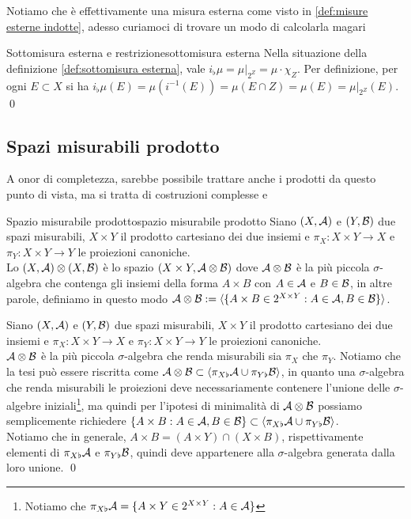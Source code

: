 \documentclass{article}
\renewcommand\A{\mc{A}}
\begin{document}
Notiamo che è effettivamente una misura esterna come visto in \ref{def:misure esterne indotte}, adesso curiamoci di trovare un modo di calcolarla magari

\begin{proposition}{Sottomisura esterna e restrizione}{sottomisura esterna}
    Nella situazione della definizione \ref{def:sottomisura esterna}, vale $i_\flat \mu = \mu|_{2^Z} = \mu \cdot \chi_Z$.
    \proof
    Per definizione, per ogni $E\subset X$ si ha $i_\flat \mu(E) = \mu(i^{-1}(E)) = \mu(E\cap Z) = \mu(E) = \mu|_{2^Z}(E)$.
    \qed
\end{proposition}

\pagebreak
\subsection{Spazi misurabili prodotto}

A onor di completezza, sarebbe possibile trattare anche i prodotti da questo punto di vista, ma si tratta di costruzioni complesse e 

\begin{definition}{Spazio misurabile prodotto}{spazio misurabile prodotto}
    Siano $(X,\A)$ e $(Y,\mathcal{B})$ due spazi misurabili, $X\times Y$ il prodotto cartesiano dei due insiemi e $\pi_X : X\times Y \to X$ e $\pi_Y : X\times Y \to Y$ le proiezioni canoniche.\\
    Lo  $(X,\A)\otimes (X,\B)$ è lo spazio $(X\times Y, \A \otimes \B)$ dove $\A \otimes\B$ è la più piccola $\sigma$-algebra che contenga gli insiemi della forma $A\times B$ con $A \in \A$ e $B \in \mathcal{B}$, in altre parole, definiamo in questo modo $\A\otimes\B := \langle\{A\times B \in 2^{X\times Y} : A \in \A, B\in \B\}\rangle$.
\end{definition}
\begin{remark}{}{}
    Siano $(X,\A)$ e $(Y,\mathcal{B})$ due spazi misurabili, $X\times Y$ il prodotto cartesiano dei due insiemi e $\pi_X : X\times Y \to X$ e $\pi_Y : X\times Y \to Y$ le proiezioni canoniche.\\
    $\A \otimes \B$ è la più piccola $\sigma$-algebra che renda misurabili sia $\pi_X$ che $\pi_Y$.
    \proof
    Notiamo che la tesi può essere riscritta come $\A\otimes\B \subset \langle\pi_{X\flat} \A \cup \pi_{Y\flat} \B\rangle $, in quanto una $\sigma$-algebra che renda misurabili le proiezioni deve necessariamente contenere l'unione delle $\sigma$-algebre iniziali\footnote{Notiamo che $\pi_{X\flat}\A = \{A \times Y \in 2^{X\times Y} : A \in \A\}$}, ma quindi per l'ipotesi di minimalità di $\A\otimes\B$ possiamo semplicemente richiedere $\{A\times B : A \in \A, B \in \B\}\subset \langle\pi_{X\flat} \A \cup \pi_{Y\flat} \B\rangle$.\\
    Notiamo che in generale, $A \times B = (A\times Y) \cap (X \times B)$, rispettivamente elementi di $\pi_{X\flat} \A$ e $\pi_{Y\flat} \mathcal{B}$, quindi deve appartenere alla $\sigma$-algebra generata dalla loro unione.
    \qed
\end{remark}
\end{document}
